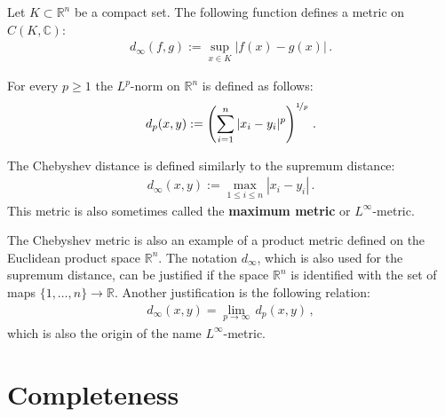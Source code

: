     \begin{example}\label{metric:supremum_distance}
        Let $K\subset\mathbb{R}^n$ be a compact set. The following function defines a metric on $C(K,\mathbb{C})$:
        \begin{gather}
            d_\infty(f,g) := \sup_{x\in K}|f(x) - g(x)|\,.
        \end{gather}
    \end{example}

    \begin{example}[p-metric]\label{metric:p_metric}
        For every $p\geq1$ the $L^p$-norm on $\mathbb{R}^n$ is defined as follows:
        \begin{gather}
            d_p(x,y) := \left(\sum_{i=1}^n|x_i-y_i|^p\right)^{\nicefrac{1}{p}}\,.
        \end{gather}
    \end{example}
    \begin{example}\label{metric:chebyshev_distance}
        The Chebyshev distance is defined similarly to the supremum distance:
        \begin{gather}
            d_\infty(x,y) := \max_{1\leq i\leq n}|x_i-y_i|\,.
        \end{gather}
        This metric is also sometimes called the \textbf{maximum metric} or $L^\infty$-metric.
    \end{example}
    \begin{remark}
        The Chebyshev metric is also an example of a product metric defined on the Euclidean product space $\mathbb{R}^n$. The notation $d_\infty$, which is also used for the supremum distance, can be justified if the space $\mathbb{R}^n$ is identified with the set of maps $\{1,\ldots,n\}\rightarrow\mathbb{R}$. Another justification is the following relation:
        \begin{gather}
            d_\infty(x,y) = \lim_{p\rightarrow\infty}\,d_p(x,y)\,,
        \end{gather}
        which is also the origin of the name $L^\infty$-metric.
    \end{remark}

\section{Completeness}


